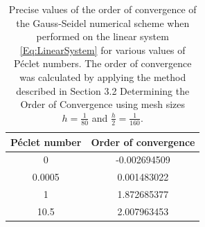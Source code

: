 \documentclass[a4paper,11pt]{article}
\theoremstyle{break}
\theoremstyle{break2}
\theoremstyle{break}
\theoremstyle{break2}
\begin{document}
\begin{table}[h!]
	\centering
	\begin{tabular}{c|c}
		P\'{e}clet number & Order of convergence \\
		\hline 
		0 & -0.002694509 \\
		0.0005 & 0.001483022 \\
		1 & 1.872685377 \\
		10.5 & 2.007963453  
	\end{tabular}
	\caption{Precise values of the order of convergence of the Gauss-Seidel numerical scheme when performed on the linear system \eqref{Eq:LinearSystem} for various values of P\'{e}clet numbers. The order of convergence was calculated by applying the method described in Section 3.2 Determining the Order of Convergence using mesh sizes $ h = \frac{1}{80} $ and $ \frac{h}{2} = \frac{1}{160} $.\label{Tab:OrderofConvergence}}
\end{table}
\end{document}
